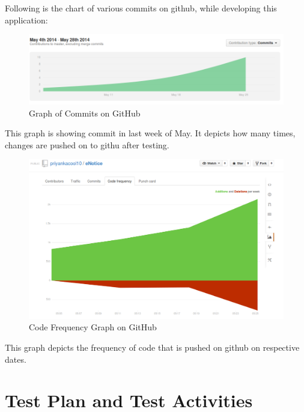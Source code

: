 Following is the chart of various commits on github, while developing this application:
\begin{figure}[H]
\centering \includegraphics[scale=0.4]{image/commit.png}
\caption{Graph of Commits on GitHub}
\end{figure}
This graph is showing commit in last week of May. It depicts how many times, changes are pushed on to githu after testing.
\begin{figure}[H]
\centering \includegraphics[scale=0.4]{image/codefrequency.png}
\caption{Code Frequency Graph on GitHub}
\end{figure}
This graph depicts the frequency of code that is pushed on github on respective dates.

\pagebreak
\section{Test Plan and Test Activities}
